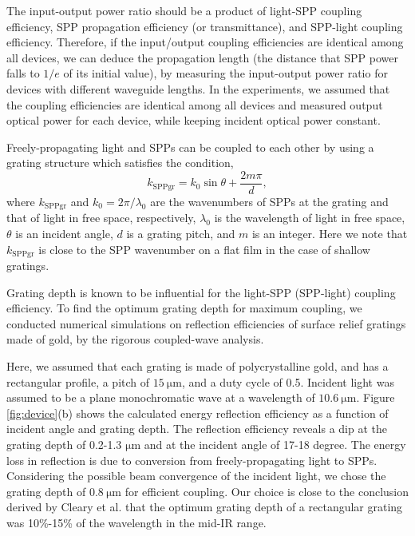 \documentclass[aip,apl,reprint]{revtex4-1}
\begin{document}
The input-output power ratio should be a product of light-SPP coupling efficiency, SPP propagation efficiency (or transmittance), and SPP-light coupling efficiency. Therefore, if the input/output coupling efficiencies are identical among all devices, we can deduce the propagation length (the distance that SPP power falls to $1/e$ of its initial value), by measuring the input-output power ratio for devices with different waveguide lengths.  In the experiments, we assumed that the coupling efficiencies are identical among all devices and measured output optical power for each device, while keeping incident optical power constant. 


Freely-propagating light and SPPs can be coupled to each other by using a grating structure which satisfies the condition\cite{Koev},
\begin{equation}
k_{\mathrm{SPPgr}}=k_0 \sin \theta + \frac{2m\pi}{d},
\label{eq:phase-match}
\end{equation}
where $k_{\mathrm{SPPgr}}$ and $k_0=2\pi/\lambda_0$ are the wavenumbers of SPPs at the grating and that of light in free space, respectively, $\lambda_0$ is the wavelength of light in free space, $\theta$ is an incident angle, $d$ is a grating pitch, and $m$ is an integer. Here we note that $k_{\mathrm{SPPgr}}$ is close to the SPP wavenumber on a flat film in the case of shallow gratings.

Grating depth is known to be influential for the light-SPP (SPP-light) coupling efficiency\cite{Koev, Cleary2010}. To find the optimum grating depth for maximum coupling, we conducted numerical simulations on reflection efficiencies of surface relief gratings made of gold, by the rigorous coupled-wave analysis\cite{Moharam}. 

Here, we assumed that each grating is made of polycrystalline gold, and has a rectangular profile, a pitch of $15\:\mathrm{\mu m}$, and a duty cycle of 0.5. Incident light was assumed to be a plane monochromatic wave at a wavelength of $10.6\:\mathrm{\mu m}$. 
Figure \ref{fig:device}(b) shows the calculated energy reflection efficiency as a function of incident angle and grating depth. The reflection efficiency reveals a dip at the grating depth of 0.2-1.3 $\mathrm{\mu m}$ and at the incident angle of 17-18 degree. The energy loss in reflection is due to conversion from freely-propagating light to SPPs.
Considering the possible beam convergence of the incident light, we chose the grating depth of $0.8\:\mathrm{\mu m}$ for efficient coupling. Our choice is close to the conclusion derived by Cleary et al.\cite{Cleary2010} that the optimum grating depth of a rectangular grating was 10\%-15\% of the wavelength in the mid-IR range.
\end{document}
